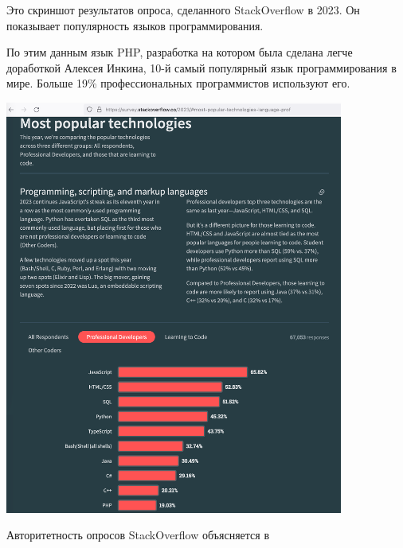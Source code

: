 
Это скриншот результатов опроса, сделанного StackOverflow в 2023.
Он показывает популярность языков программирования.

По этим данным язык PHP,
разработка на котором была сделана легче доработкой Алексея Инкина,
10-й самый популярный язык программирования в мире.
Больше 19\% профессиональных программистов используют его.

\begin{center}
    \includegraphics[width=30em]{php-stackoverflow}
\end{center}

Авторитетность опросов StackOverflow объясняется в 

\pagebreak
